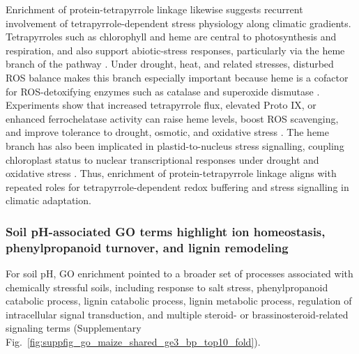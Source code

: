 \documentclass[unnumsec,webpdf,contemporary,large]{oup-authoring-template}%
\theoremstyle{thmstyleone}%
\theoremstyle{thmstyletwo}%
\theoremstyle{thmstylethree}%
\begin{document}
Enrichment of protein-tetrapyrrole linkage likewise suggests recurrent involvement of tetrapyrrole-dependent stress physiology along climatic gradients. Tetrapyrroles such as chlorophyll and heme are central to photosynthesis and respiration, and also support abiotic-stress responses, particularly via the heme branch of the pathway \citep{Nagahatenna2015}. Under drought, heat, and related stresses, disturbed ROS balance makes this branch especially important because heme is a cofactor for ROS-detoxifying enzymes such as catalase and superoxide dismutase \citep{Nagahatenna2015}. Experiments show that increased tetrapyrrole flux, elevated Proto IX, or enhanced ferrochelatase activity can raise heme levels, boost ROS scavenging, and improve tolerance to drought, osmotic, and oxidative stress \citep{Allen2010,ThuHa2011,Kim2014Tetrapyrrole}. The heme branch has also been implicated in plastid-to-nucleus stress signalling, coupling chloroplast status to nuclear transcriptional responses under drought and oxidative stress \citep{Nagai2007,Woodson2011,Woodson2013,Nagahatenna2015}. Thus, enrichment of protein-tetrapyrrole linkage aligns with repeated roles for tetrapyrrole-dependent redox buffering and stress signalling in climatic adaptation.



\subsubsection{Soil pH-associated GO terms highlight ion homeostasis, phenylpropanoid turnover, and lignin remodeling}

For soil pH, GO enrichment pointed to a broader set of processes associated with chemically stressful soils, including response to salt stress, phenylpropanoid catabolic process, lignin catabolic process, lignin metabolic process, regulation of intracellular signal transduction, and multiple steroid- or brassinosteroid-related signaling terms (Supplementary Fig.~\ref{fig:suppfig_go_maize_shared_ge3_bp_top10_fold}).
\end{document}

